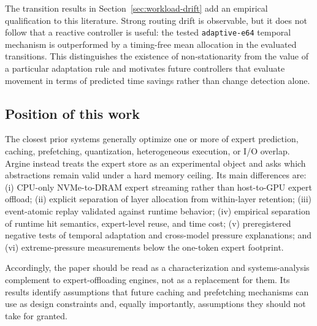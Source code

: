 The transition results in Section~\ref{sec:workload-drift} add an empirical qualification to this literature. Strong routing drift is observable, but it does not follow that a reactive controller is useful: the tested \texttt{adaptive-e64} temporal mechanism is outperformed by a timing-free mean allocation in the evaluated transitions. This distinguishes the existence of non-stationarity from the value of a particular adaptation rule and motivates future controllers that evaluate movement in terms of predicted time savings rather than change detection alone.

\subsection{Position of this work}

The closest prior systems generally optimize one or more of expert prediction, caching, prefetching, quantization, heterogeneous execution, or I/O overlap. Argine instead treats the expert store as an experimental object and asks which abstractions remain valid under a hard memory ceiling. Its main differences are: (i) CPU-only NVMe-to-DRAM expert streaming rather than host-to-GPU expert offload; (ii) explicit separation of layer allocation from within-layer retention; (iii) event-atomic replay validated against runtime behavior; (iv) empirical separation of runtime hit semantics, expert-level reuse, and time cost; (v) preregistered negative tests of temporal adaptation and cross-model pressure explanations; and (vi) extreme-pressure measurements below the one-token expert footprint.

Accordingly, the paper should be read as a characterization and systems-analysis complement to expert-offloading engines, not as a replacement for them. Its results identify assumptions that future caching and prefetching mechanisms can use as design constraints and, equally importantly, assumptions they should not take for granted.
